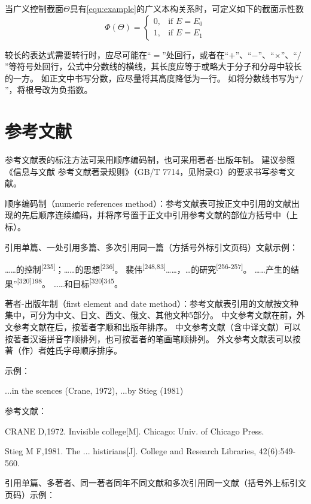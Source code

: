 当广义控制截面$\Theta$具有\ref{equ:example}的广义本构关系时，可定义如下的截面示性数
\begin{equation}
    \Phi\left(\Theta\right) =
    \begin{cases}
        0, & \text{if } E = E_{0} \\
        1, & \text{if } E = E_{1}
    \end{cases}
    \label{equ:example}
\end{equation}

较长的表达式需要转行时，应尽可能在“$=$”处回行，或者在“$+$”、“$-$”、“$\times$”、“$/$”等符号处回行，公式中分数线的横线，其长度应等于或略大于分子和分母中较长的一方。
如正文中书写分数，应尽量将其高度降低为一行。
如将分数线书写为“$/$”，将根号改为负指数。

\section{参考文献}

参考文献表的标注方法可采用顺序编码制，也可采用著者-出版年制。
建议参照《信息与文献 参考文献著录规则》（GB/T 7714，见附录G）的要求书写参考文献。

顺序编码制（numeric references method）：参考文献表可按正文中引用的文献出现的先后顺序连续编码，并将序号置于正文中引用参考文献的部位方括号中（上标）。

引用单篇、一处引用多篇、多次引用同一篇（方括号外标引文页码）文献示例：

……的控制\textsuperscript{[235]}；……的思想\textsuperscript{[236]}。
裴伟\textsuperscript{[248,83]}……，…的研究\textsuperscript{[256-257]}。
……产生的结果”\textsuperscript{[320]198}。
……和目标\textsuperscript{[320]345}。

著者-出版年制（first element and date method）：参考文献表引用的文献按文种集中，可分为中文、日文、西文、俄文、其他文种5部分。
中文参考文献在前，外文参考文献在后，按著者字顺和出版年排序。
中文参考文献（含中译文献）可以按著者汉语拼音字顺排列，也可按著者的笔画笔顺排列。
外文参考文献表可以按著（作）者姓氏字母顺序排序。

示例：

...in the scences (Crane, 1972), ...by Stieg (1981)

参考文献：

CRANE D,1972. Invisible college[M]. Chicago: Univ. of Chicago Press.

Stieg M F,1981. The ... histirians[J]. College and Research Libraries, 42(6):549-560.

引用单篇、多著者、同一著者同年不同文献和多次引用同一文献（括号外上标引文页码）示例：

